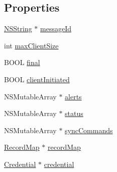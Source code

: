 \subsection*{\-Properties}
\begin{DoxyCompactItemize}
\item 
\hyperlink{class_n_s_string}{\-N\-S\-String} $\ast$ \hyperlink{interface_sync_message_ad0b78ee61dac9c1c6cff05d3780c366f}{message\-Id}
\item 
int \hyperlink{interface_sync_message_ab2f9b90e643a621ba75e0cb084cfb4d5}{max\-Client\-Size}
\item 
\-B\-O\-O\-L \hyperlink{interface_sync_message_a8e550097797eafe27d811883bfb50d63}{final}
\item 
\-B\-O\-O\-L \hyperlink{interface_sync_message_af94a7474e3e3fcefb700ab32711376bd}{client\-Initiated}
\item 
\-N\-S\-Mutable\-Array $\ast$ \hyperlink{interface_sync_message_a298c7c8fa93597484aa05023bab3e328}{alerts}
\item 
\-N\-S\-Mutable\-Array $\ast$ \hyperlink{interface_sync_message_a8b3f2df455e9e7f88c6826ebcb0caa7d}{status}
\item 
\-N\-S\-Mutable\-Array $\ast$ \hyperlink{interface_sync_message_a022ca7fd27c57d2f473f4a80b201b1ee}{sync\-Commands}
\item 
\hyperlink{interface_record_map}{\-Record\-Map} $\ast$ \hyperlink{interface_sync_message_ad74bd9818d32261c89c69825adb793f3}{record\-Map}
\item 
\hyperlink{interface_credential}{\-Credential} $\ast$ \hyperlink{interface_sync_message_a3a818b8e15c1cfca6fe31e4c95c04694}{credential}
\end{DoxyCompactItemize}


